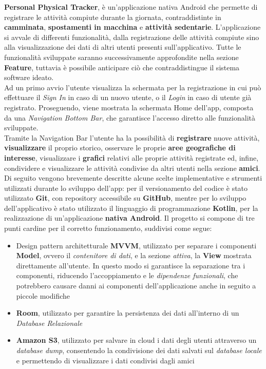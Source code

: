 \documentclass{article}
\begin{document}
    \textbf{Personal Physical Tracker}, è un'applicazione nativa Android che permette di registrare le attività compiute durante la giornata, contraddistinte in \textbf{camminata}, \textbf{spostamenti in macchina} e \textbf{attività sedentarie}.
    L'applicazione si avvale di differenti funzionalità, dalla registrazione delle attività compiute sino alla visualizzazione dei dati di altri utenti presenti sull'applicativo. Tutte le funzionalità sviluppate saranno successivamente approfondite nella sezione \textbf{Feature}, tuttavia è possibile anticipare ciò che contraddistingue il sistema software ideato. \vspace*{7pt}\\
    Ad un primo avvio l'utente visualizza la schermata per la registrazione in cui può effettuare il \textit{Sign In} in caso di un nuovo utente, o il \textit{Login} in caso di utente già registrato. Proseguendo, viene mostrata la schermata Home dell'app, composta da una \textit{Navigation Bottom Bar}, che garantisce l'accesso diretto alle funzionalità sviluppate. \\
    Tramite la Navigation Bar l'utente ha la possibilità di \textbf{registrare} nuove attività, \textbf{visualizzare} il proprio storico, osservare le proprie \textbf{aree geografiche di interesse}, visualizzare i \textbf{grafici} relativi alle proprie attività registrate ed, infine, condividere e visualizzare le attività condivise da altri utenti nella sezione \textbf{amici}. \vspace*{7pt}\\
    Di seguito vengono brevemente descritte alcune scelte implementative e strumenti utilizzati durante lo sviluppo dell'app: per il versionamento del codice è stato utilizzato \textbf{Git}, con repository accessibile su \textbf{GitHub}, mentre per lo sviluppo dell'applicativo è stato utilizzato il linguaggio di programmazione \textbf{Kotlin}, per la realizzazione di un'applicazione \textbf{nativa Android}. Il progetto si compone di tre punti cardine per il corretto funzionamento, suddivisi come segue:
    \begin{itemize}
        \renewcommand{\labelitemi}{-}
        \item Design pattern architetturale \textbf{MVVM}, utilizzato per separare i componenti \textbf{Model}, ovvero il \textit{contenitore di dati}, e la sezione \textit{attiva}, la \textbf{View} mostrata direttamente all'utente. In questo modo si garantisce la separazione tra i componenti, riducendo l'accoppiamento e le \textit{dipendenze funzionali}, che potrebbero causare danni ai componenti dell'applicazione anche in seguito a piccole modifiche
        \item \textbf{Room}, utilizzato per garantire la persistenza dei dati all'interno di un \textit{Database Relazionale}
        \item \textbf{Amazon S3}, utilizzato per salvare in cloud i dati degli utenti attraverso un \textit{database dump}, consentendo la condivisione dei dati salvati sul \textit{database locale} e permettendo di visualizzare i dati condivisi dagli amici
    \end{itemize}
\end{document}
